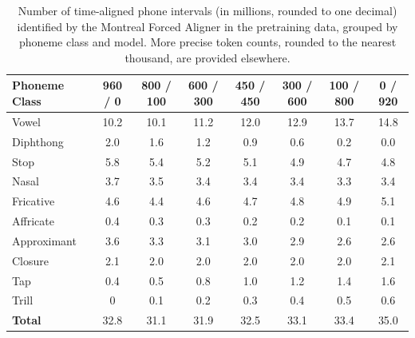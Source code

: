 \begin{table}
\centering
\small
\begin{tabular}{l|ccccccc}
\toprule
Phoneme Class & 960 / 0 & 800 / 100 & 600 / 300 & 450 / 450 & 300 / 600 & 100 / 800 & 0 / 920 \\
\midrule
Vowel        & 10.2 & 10.1 & 11.2 & 12.0 & 12.9 & 13.7 & 14.8 \\
Diphthong    &  2.0 &  1.6 &  1.2 &  0.9 &  0.6 &  0.2 &  0.0 \\
Stop         &  5.8 &  5.4 &  5.2 &  5.1 &  4.9 &  4.7 &  4.8 \\
Nasal        &  3.7 &  3.5 &  3.4 &  3.4 &  3.4 &  3.3 &  3.4 \\
Fricative    &  4.6 &  4.4 &  4.6 &  4.7 &  4.8 &  4.9 &  5.1 \\
Affricate    &  0.4 &  0.3 &  0.3 &  0.2 &  0.2 &  0.1 &  0.1 \\
Approximant  &  3.6 &  3.3 &  3.1 &  3.0 &  2.9 &  2.6 &  2.6 \\
Closure      &  2.1 &  2.0 &  2.0 &  2.0 &  2.0 &  2.0 &  2.1 \\
Tap          & 0.4  & 0.5  &  0.8 &  1.0 &  1.2 &  1.4 &  1.6 \\
Trill        & 0    & 0.1  &  0.2  & 0.3  & 0.4  & 0.5  & 0.6 \\
\addlinespace
\textbf{Total} & 32.8 & 31.1 & 31.9 & 32.5 & 33.1 & 33.4 & 35.0 \\
\bottomrule
\end{tabular}
\caption{Number of time-aligned phone intervals (in millions, rounded to one decimal) identified by the Montreal Forced Aligner in the pretraining data, grouped by phoneme class and model. More precise token counts, rounded to the nearest thousand, are provided elsewhere.}

\label{ed_tab:phoneme_token_class_counts_m}
\end{table}



